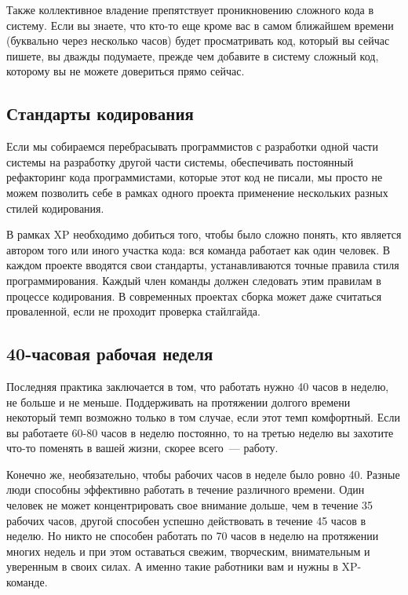 \documentclass{../../text-style}
\begin{document}
Также коллективное владение препятствует проникновению сложного кода в систему. Если вы знаете, что кто-то еще кроме вас в самом ближайшем времени (буквально через несколько часов) будет просматривать код, который вы сейчас пишете, вы дважды подумаете, прежде чем добавите в систему сложный код, которому вы не можете довериться прямо сейчас. 

\subsection{Стандарты кодирования}

Если мы собираемся перебрасывать программистов с разработки одной части системы на разработку другой части системы, обеспечивать постоянный рефакторинг кода программистами, которые этот код не писали, мы просто не можем позволить себе в рамках одного проекта применение нескольких разных стилей кодирования.

В рамках XP необходимо добиться того, чтобы было сложно понять, кто является автором того или иного участка кода: вся команда работает как один человек. В каждом проекте вводятся свои стандарты, устанавливаются точные правила стиля программирования. Каждый член команды должен следовать этим правилам в процессе кодирования. В современных проектах сборка может даже считаться проваленной, если не проходит проверка стайлгайда.

\subsection{40-часовая рабочая неделя}

Последняя практика заключается в том, что работать нужно 40 часов в неделю, не больше и не меньше. Поддерживать на протяжении долгого времени некоторый темп возможно только в том случае, если этот темп комфортный. Если вы работаете 60-80 часов в неделю постоянно, то на третью неделю вы захотите что-то поменять в вашей жизни, скорее всего~--- работу.

Конечно же, необязательно, чтобы рабочих часов в неделе было ровно 40. Разные люди способны эффективно работать в течение различного времени. Один человек не может концентрировать свое внимание дольше, чем в течение 35 рабочих часов, другой способен успешно действовать в течение 45 часов в неделю. Но никто не способен работать по 70 часов в неделю на протяжении многих недель и при этом оставаться свежим, творческим, внимательным и уверенным в своих силах. А именно такие работники вам и нужны в XP-команде.
\end{document}
